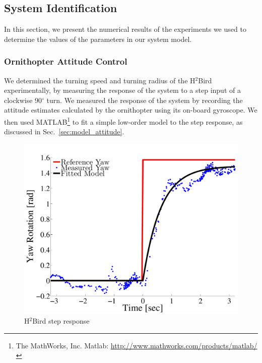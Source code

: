 \documentclass{aamas2013}
\begin{document}
\subsection{System Identification}

In this section, we present the numerical results of the experiments we used to 
determine the values of the parameters in our system model. 

\subsubsection{Ornithopter Attitude Control}
\label{sec:flight_control}
We determined the turning speed and turning radius of the H$^2$Bird 
experimentally, by measuring the response of the system to a step input of a 
clockwise 90$^{\circ}$ turn. We measured the response of the system by 
recording the attitude estimates calculated by the ornithopter using its 
on-board gyroscope. We then used MATLAB\footnote{The MathWorks, Inc. Matlab:
\href{http://www.mathworks.com/products/matlab/}
     {http://www.mathworks.com/products/matlab/}} 
to fit a simple low-order model to the step response, as discussed in 
Sec.~\ref{sec:model_attitude}.

\begin{figure}[tb]
\centering
\includegraphics[width=\linewidth]{figures/step_response_total.pdf}
\caption{H$^2$Bird step response}
\label{fig:step_response}
\end{figure}
\end{document}
